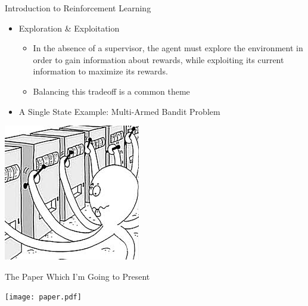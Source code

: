 \documentclass{beamer}
\begin{document}
\begin{frame}[t]{Introduction to Reinforcement Learning} %
	\begin{itemize}
\item Exploration \& Exploitation
	\begin{itemize}
	\item In the absence of a supervisor, the agent must explore the environment in order to gain information about rewards, while exploiting its current information to maximize its rewards.
	\item Balancing this tradeoff is a common theme
	\end{itemize}
\item A Single State Example: Multi-Armed Bandit Problem
\end{itemize}
\begin{center}
\includegraphics[scale=0.45]{multi}
\end{center}
\end{frame}

\begin{frame}[t]{The Paper Which I'm Going to Present} %
\begin{center}
\texttt{[image: paper.pdf]}
\end{center}

\end{frame}
\end{document}
